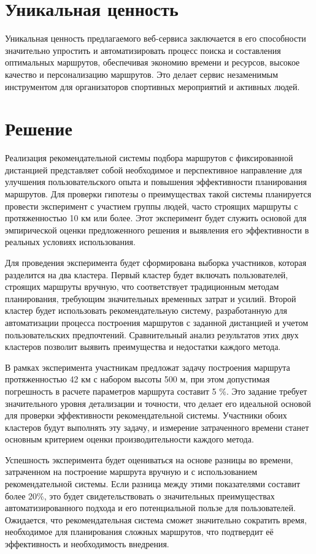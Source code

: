 \section{Уникальная ценность}

Уникальная ценность предлагаемого веб-сервиса заключается в его способности значительно упростить и автоматизировать процесс поиска и составления оптимальных маршрутов, обеспечивая экономию времени и ресурсов, высокое качество и персонализацию маршрутов. Это делает сервис незаменимым инструментом для организаторов спортивных мероприятий и активных людей.

\section{Решение}

Реализация рекомендательной системы подбора маршрутов с фиксированной дистанцией представляет собой необходимое и перспективное направление для улучшения пользовательского опыта и повышения эффективности планирования маршрутов. Для проверки гипотезы о преимуществах такой системы планируется провести эксперимент с участием группы людей, часто строящих маршруты с протяженностью 10 км или более. Этот эксперимент будет служить основой для эмпирической оценки предложенного решения и выявления его эффективности в реальных условиях использования.

Для проведения эксперимента будет сформирована выборка участников, которая разделится на два кластера. Первый кластер будет включать пользователей, строящих маршруты вручную, что соответствует традиционным методам планирования, требующим значительных временных затрат и усилий. Второй кластер будет использовать рекомендательную систему, разработанную для автоматизации процесса построения маршрутов с заданной дистанцией и учетом пользовательских предпочтений. Сравнительный анализ результатов этих двух кластеров позволит выявить преимущества и недостатки каждого метода.

В рамках эксперимента участникам предложат задачу построения маршрута протяженностью 42 км с набором высоты 500 м, при этом допустимая погрешность в расчете параметров маршрута составит 5   \%. Это задание требует значительного уровня детализации и точности, что делает его идеальной основой для проверки эффективности рекомендательной системы. Участники обоих кластеров будут выполнять эту задачу, и измерение затраченного времени станет основным критерием оценки производительности каждого метода.

Успешность эксперимента будет оцениваться на основе разницы во времени, затраченном на построение маршрута вручную и с использованием рекомендательной системы. Если разница между этими показателями составит более 20\%, это будет свидетельствовать о значительных преимуществах автоматизированного подхода и его потенциальной пользе для пользователей. Ожидается, что рекомендательная система сможет значительно сократить время, необходимое для планирования сложных маршрутов, что подтвердит её эффективность и необходимость внедрения.

